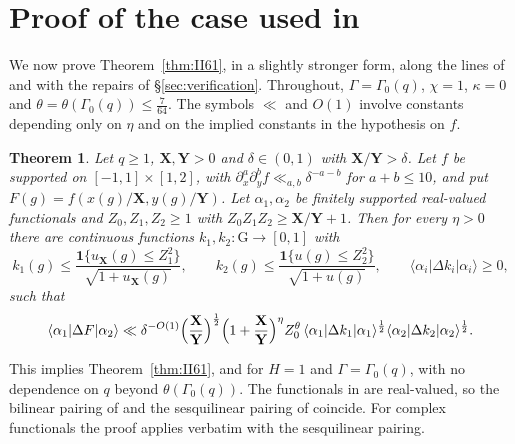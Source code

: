 \documentclass[11pt]{amsart}
\newtheorem{theorem}{Theorem}[section]
\theoremstyle{remark}
\theoremstyle{definition}
\numberwithin{equation}{section}
\newcommand{\G}{\mathrm{G}}
\newcommand{\one}{\mathbf{1}}
\newcommand{\br}[1]{\langle #1\rangle}
\newcommand{\bX}{\mathbf{X}}
\newcommand{\bY}{\mathbf{Y}}
\begin{document}
\section{Proof of the case used in \texorpdfstring{\cite{II}}{[II]}}\label{sec:proof}

We now prove Theorem~\ref{thm:II61}, in a slightly stronger form, along the lines of \cite{GM1} and with the repairs of \S\ref{sec:verification}. Throughout, $\Gamma=\Gamma_0(q)$, $\chi=1$, $\kappa=0$ and $\theta=\theta(\Gamma_0(q))\le\frac7{64}$. The symbols $\ll$ and $O(1)$ involve constants depending only on $\eta$ and on the implied constants in the hypothesis on $f$.

\begin{theorem}\label{thm:main}
Let $q\ge1$, $\bX,\bY>0$ and $\delta\in(0,1)$ with $\bX/\bY>\delta$. Let $f$ be supported on $[-1,1]\times[1,2]$, with $\partial_x^{a}\partial_y^{b}f\ll_{a,b}\delta^{-a-b}$ for $a+b\le10$, and put $F(g)=f(x(g)/\bX,y(g)/\bY)$. Let $\alpha_1,\alpha_2$ be finitely supported real-valued functionals and $Z_0,Z_1,Z_2\ge1$ with $Z_0Z_1Z_2\ge\bX/\bY+1$. Then for every $\eta>0$ there are continuous functions $k_1,k_2:\G\to[0,1]$ with
\[
k_1(g)\le\frac{\one\{u_{\bX}(g)\le Z_1^2\}}{\sqrt{1+u_{\bX}(g)}},\qquad k_2(g)\le\frac{\one\{u(g)\le Z_2^2\}}{\sqrt{1+u(g)}},\qquad\br{\alpha_i|\Delta k_i|\alpha_i}\ge0,
\]
such that
\[
\br{\alpha_1|\Delta F|\alpha_2}\ll\delta^{-O(1)}\Bigl(\frac{\bX}{\bY}\Bigr)^{\frac12}\Bigl(1+\frac{\bX}{\bY}\Bigr)^{\eta}Z_0^{\theta}\,\br{\alpha_1|\Delta k_1|\alpha_1}^{\frac12}\br{\alpha_2|\Delta k_2|\alpha_2}^{\frac12}.
\]
\end{theorem}

This implies Theorem~\ref{thm:II61}, and \cite[Theorem~2.1]{GM2} for $H=1$ and $\Gamma=\Gamma_0(q)$, with no dependence on $q$ beyond $\theta(\Gamma_0(q))$. The functionals in \cite{II} are real-valued, so the bilinear pairing of \cite{II} and the sesquilinear pairing of \cite{GM1} coincide. For complex functionals the proof applies verbatim with the sesquilinear pairing.
\end{document}
